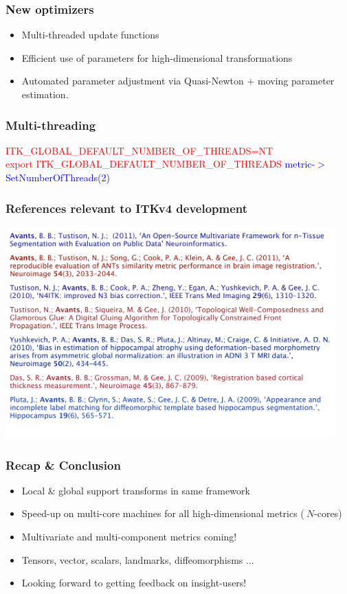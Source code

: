 \begin{frame}
\frametitle{New optimizers}
\Large
\begin{itemize}
\item Multi-threaded update functions
\item Efficient use of parameters for high-dimensional transformations
\item Automated parameter adjustment via Quasi-Newton $+$ moving parameter estimation.
\end{itemize}
\end{frame}

\begin{frame}
\Large
\frametitle{Multi-threading}
\textcolor{red}{ ITK\_GLOBAL\_DEFAULT\_NUMBER\_OF\_THREADS=NT}\\
\textcolor{red}{export ITK\_GLOBAL\_DEFAULT\_NUMBER\_OF\_THREADS}
\newline
\newline
\textcolor{blue}{metric-$>$SetNumberOfThreads(2)}
\end{frame}

\begin{frame}
\Large
\frametitle{References relevant to ITKv4 development}
\includegraphics[height=3.2in]{../Art/registration_references}
\end{frame}

\begin{frame}
\Large
\frametitle{Recap \& Conclusion}
\begin{itemize}
\item Local \& global support transforms in same framework
\pause
\item Speed-up on multi-core machines for all high-dimensional metrics ($~N$-cores)
\pause
\item Multivariate and multi-component metrics coming!
\pause
\item Tensors, vector, scalars, landmarks, diffeomorphisms ... 
\pause
\item Looking forward to getting feedback on insight-users! 
\end{itemize}
\end{frame}
